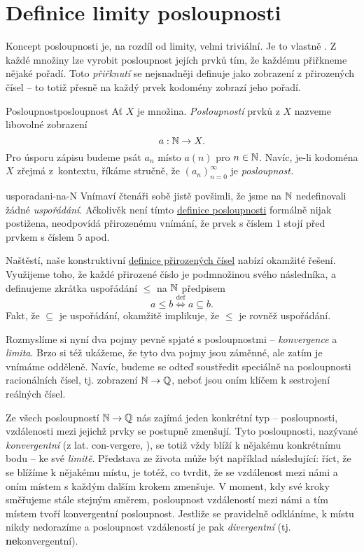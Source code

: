 \section{Definice limity posloupnosti}
\label{sec:definice-limity-posloupnosti}

Koncept posloupnosti je, na rozdíl od limity, velmi triviální. Je to vlastně
. Z každé množiny lze vyrobit posloupnost jejích
prvků tím, že každému přiřkneme nějaké pořadí. Toto \emph{přiřknutí} se
nejsnadněji definuje jako zobrazení z přirozených čísel -- to totiž přesně na
každý prvek kodomény zobrazí jeho pořadí.

\begin{definition}{Posloupnost}{posloupnost}
 Ať $X$ je množina. \emph{Posloupností} prvků z $X$ nazveme libovolné zobrazení
 \[
  a:\mathbb{N} \to X.
 \]
 Pro úsporu zápisu budeme psát $a_n$ místo $a(n)$ pro $n \in \mathbb{N}$. Navíc, je-li
 kodoména $X$ zřejmá z~kontextu, říkáme stručně, že $(a_n)_{n=0}^{\infty}$ je
 \emph{posloupnost.}
\end{definition}

\begin{remark}{}{usporadani-na-N}
 Vnímaví čtenáři sobě jistě povšimli, že jsme na $\mathbb{N}$ nedefinovali žádné
 \emph{uspořádání}. Ačkolivěk není tímto \hyperref[def:posloupnost]{definice
 posloupnosti} formálně nijak postižena, neodpovídá přirozenému vnímání, že
 prvek s číslem $1$ stojí před prvkem s číslem $5$ apod.

 Naštěstí, naše konstruktivní \hyperref[def:prirozena-cisla]{definice
 přirozených čísel} nabízí okamžité řešení. Využijeme toho, že každé přirozené
 číslo je podmnožinou svého následníka, a definujeme zkrátka uspořádání $ \leq $
 na $\mathbb{N}$ předpisem
 \[
  a \leq b \overset{\text{def}}{\iff} a \subseteq b.
 \]
 Fakt, že $ \subseteq $ je uspořádání, okamžitě implikuje, že $ \leq $ je rovněž
 uspořádání.
\end{remark}

Rozmyslíme si nyní dva pojmy pevně spjaté s posloupnostmi -- \emph{konvergence}
a \emph{limita}. Brzo si též ukážeme, že tyto dva pojmy jsou záměnné, ale zatím
je vnímáme odděleně. Navíc, budeme se odteď soustředit speciálně na posloupnosti
racionálních čísel, tj. zobrazení $\mathbb{N} \to \mathbb{Q}$, neboť jsou oním klíčem k
sestrojení reálných čísel.

Ze všech posloupností $\mathbb{N} \to \mathbb{Q}$ nás zajímá jeden konkrétní typ --
posloupnosti, vzdálenosti mezi jejichž prvky se postupně zmenšují. Tyto
posloupnosti, nazývané \emph{konvergentní} (z lat. con-vergere, ), se totiž vždy blíží k nějakému konkrétnímu bodu -- ke své \emph{limitě}.
Představa ze života může být například následující: říct, že se blížíme k
nějakému místu, je totéž, co tvrdit, že se vzdálenost mezi námi a oním místem s
každým dalším krokem zmenšuje. V moment, kdy své kroky směřujeme stále stejným
směrem, posloupnost vzdáleností mezi námi a tím místem tvoří konvergentní
posloupnost. Jestliže se pravidelně odkláníme, k místu nikdy nedorazíme a
posloupnost vzdáleností je pak \emph{divergentní} (tj.
\textbf{ne}konvergentní).

